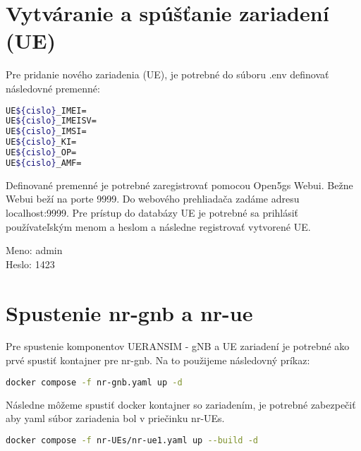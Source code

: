 \begin{refsegment}
\section{Vytváranie a spúšťanie zariadení (UE)}
Pre pridanie nového zariadenia (UE), je potrebné do súboru .env definovať následovné premenné:

\begin{lstlisting}[language=bash,caption={Súbor .env - Pridanie UE}, style=env]
UE${cislo}_IMEI=
UE${cislo}_IMEISV=
UE${cislo}_IMSI= 
UE${cislo}_KI=
UE${cislo}_OP= 
UE${cislo}_AMF=
\end{lstlisting}

Definované premenné je potrebné zaregistrovať pomocou Open5gs Webui. Bežne Webui beží na porte 9999. Do webového prehliadača zadáme adresu localhost:9999. Pre prístup do databázy UE je potrebné sa prihlásiť používateľským menom a heslom a následne registrovať vytvorené UE.

Meno: admin \\
Heslo: 1423

\section{Spustenie nr-gnb a nr-ue}
Pre spustenie komponentov UERANSIM - gNB a UE zariadení je potrebné ako prvé spustiť kontajner pre nr-gnb. Na to použijeme následovný príkaz:

\begin{lstlisting}[language=bash,caption={Spustenie nr-gnb}, style=docker]
docker compose -f nr-gnb.yaml up -d
\end{lstlisting}

Následne môžeme spustiť docker kontajner so zariadením, je potrebné zabezpečiť aby yaml súbor zariadenia bol v priečinku nr-UEs.
\begin{lstlisting}[language=bash,caption={Spustenie nr-ue}, style=docker]
docker compose -f nr-UEs/nr-ue1.yaml up --build -d
\end{lstlisting}

\printbibliography[heading=referencessec,segment=\therefsegment,resetnumbers=true]

\end{refsegment}